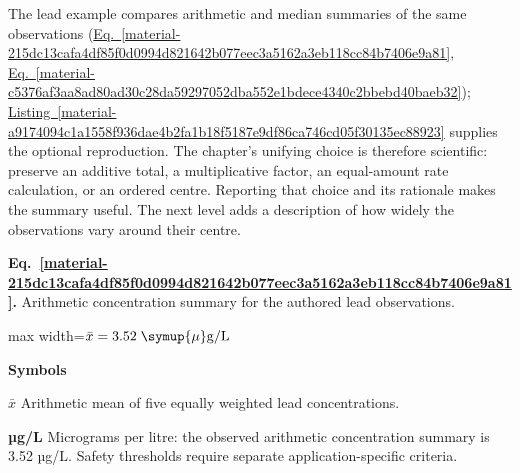 \documentclass[11pt,a4paper]{article}
\begin{document}
The lead example compares arithmetic and median summaries of the same observations (\hyperref[material-215dc13cafa4df85f0d0994d821642b077eec3a5162a3eb118cc84b7406e9a81]{Eq.~\ref*{material-215dc13cafa4df85f0d0994d821642b077eec3a5162a3eb118cc84b7406e9a81}}, \hyperref[material-c5376af3aa8ad80ad30c28da59297052dba552e1bdece4340c2bbebd40baeb32]{Eq.~\ref*{material-c5376af3aa8ad80ad30c28da59297052dba552e1bdece4340c2bbebd40baeb32}}); \hyperref[material-a9174094c1a1558f936dae4b2fa1b18f5187e9df86ca746cd05f30135ec88923]{Listing~\ref*{material-a9174094c1a1558f936dae4b2fa1b18f5187e9df86ca746cd05f30135ec88923}} supplies the optional reproduction. The chapter's unifying choice is therefore scientific: preserve an additive total, a multiplicative factor, an equal-amount rate calculation, or an ordered centre. Reporting that choice and its rationale makes the summary useful. The next level adds a description of how widely the observations vary around their centre.


\par\medskip
\begin{samepage}
\label{material-215dc13cafa4df85f0d0994d821642b077eec3a5162a3eb118cc84b7406e9a81}
\noindent\textbf{Eq.~\ref*{material-215dc13cafa4df85f0d0994d821642b077eec3a5162a3eb118cc84b7406e9a81}.} Arithmetic concentration summary for the authored lead observations.\par\nopagebreak
\begin{center}\begin{adjustbox}{max width=\linewidth}$\displaystyle \bar{x}=3.52\;\symup{\mu}\mathrm{g/L}$\end{adjustbox}\end{center}

\par\noindent\textbf{Symbols}

\par\noindent\textbf{\ensuremath{\bar{x}}} Arithmetic mean of five equally weighted lead concentrations.

\par\noindent\textbf{µg/L} Micrograms per litre: the observed arithmetic concentration summary is 3.52 µg/L. Safety thresholds require separate application-specific criteria.

\end{samepage}
\medskip
\end{document}
